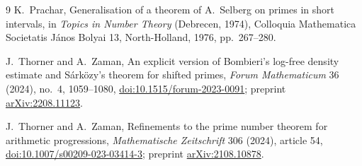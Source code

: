 \documentclass[11pt]{article}
\theoremstyle{remark}
\begin{document}
\begin{thebibliography}{9}
K.~Prachar,
\newblock Generalisation of a theorem of A.~Selberg on primes in short
intervals,
\newblock in \emph{Topics in Number Theory} (Debrecen, 1974), Colloquia
Mathematica Societatis J\'anos Bolyai 13, North-Holland, 1976, pp.~267--280.

J.~Thorner and A.~Zaman,
\newblock An explicit version of Bombieri's log-free density estimate and
S\'ark\"ozy's theorem for shifted primes,
\newblock \emph{Forum Mathematicum} 36 (2024), no.~4, 1059--1080,
\newblock \href{https://doi.org/10.1515/forum-2023-0091}
{doi:10.1515/forum-2023-0091}; preprint
\href{https://arxiv.org/abs/2208.11123}{arXiv:2208.11123}.

J.~Thorner and A.~Zaman,
\newblock Refinements to the prime number theorem for arithmetic progressions,
\newblock \emph{Mathematische Zeitschrift} 306 (2024), article 54,
\newblock \href{https://doi.org/10.1007/s00209-023-03414-3}
{doi:10.1007/s00209-023-03414-3}; preprint
\href{https://arxiv.org/abs/2108.10878}{arXiv:2108.10878}.
\end{thebibliography}
\end{document}
